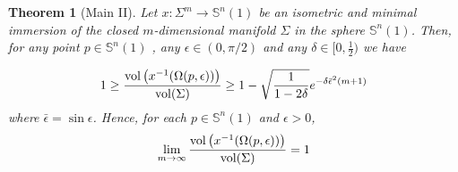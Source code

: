 \documentclass{amsart}
\newtheorem{theorem}{Theorem}[section]
\theoremstyle{definition}
\theoremstyle{remark}
\newcommand{\ese}{\mathbb{S}}
\begin{document}
\begin{theorem}[Main II]\label{extconc2}
Let  $x: \Sigma^m \to \mathbb{S}^n(1)$ be an isometric and minimal immersion of the closed $m$-dimensional manifold $\Sigma$ in the sphere  $\mathbb{S}^n(1)$. Then, for any point $p \in \mathbb{S}^n(1)$ , any  $\epsilon \in (0,\pi/2)$ and any $\delta\in [0,\frac{1}{2})$ we have 

\begin{equation}\label{eq4Bis}
1\geq \frac{{\rm vol}\left(x^{-1}(\Omega(p,\epsilon))\right)}{{\rm vol}(\Sigma)}\geq  1- \sqrt{\frac{1}{1-2\delta}}e^{-\delta\bar\epsilon^2(m+1)}
\end{equation}
where $\bar\epsilon=\sin\epsilon$.  Hence, for each $p \in \ese^n(1)$ and $\epsilon>0$,
$$
\lim_{m\to\infty}\frac{{\rm vol}\left(x^{-1}(\Omega(p,\epsilon))\right)}{{\rm vol}(\Sigma)}=1
$$
\end{theorem}
\end{document}

